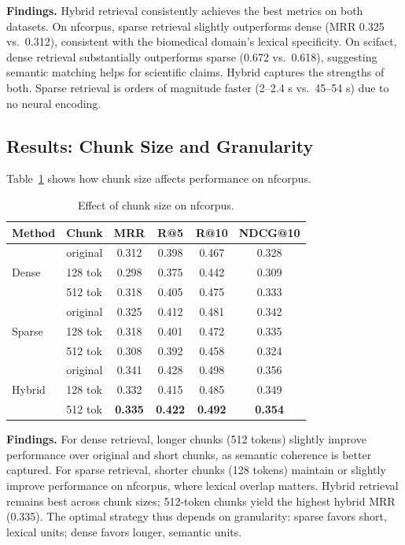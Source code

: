 \documentclass[twoside,11pt]{article}
\begin{document}
\textbf{Findings.} Hybrid retrieval consistently achieves the best metrics on both datasets. On nfcorpus, sparse retrieval slightly outperforms dense (MRR 0.325 vs.\ 0.312), consistent with the biomedical domain's lexical specificity. On scifact, dense retrieval substantially outperforms sparse (0.672 vs.\ 0.618), suggesting semantic matching helps for scientific claims. Hybrid captures the strengths of both. Sparse retrieval is orders of magnitude faster (2--2.4 s vs.\ 45--54 s) due to no neural encoding.

\subsection{Results: Chunk Size and Granularity}

Table~\ref{tab:chunk} shows how chunk size affects performance on nfcorpus.

\begin{table}[htbp]
\centering
\caption{Effect of chunk size on nfcorpus.}
\label{tab:chunk}
\begin{tabular}{llcccc}
\toprule
Method & Chunk & MRR & R@5 & R@10 & NDCG@10 \\
\midrule
\multirow{3}{*}{Dense}  & original & 0.312 & 0.398 & 0.467 & 0.328 \\
                        & 128 tok  & 0.298 & 0.375 & 0.442 & 0.309 \\
                        & 512 tok  & 0.318 & 0.405 & 0.475 & 0.333 \\
\midrule
\multirow{3}{*}{Sparse} & original & 0.325 & 0.412 & 0.481 & 0.342 \\
                        & 128 tok  & 0.318 & 0.401 & 0.472 & 0.335 \\
                        & 512 tok  & 0.308 & 0.392 & 0.458 & 0.324 \\
\midrule
\multirow{3}{*}{Hybrid} & original & 0.341 & 0.428 & 0.498 & 0.356 \\
                        & 128 tok  & 0.332 & 0.415 & 0.485 & 0.349 \\
                        & 512 tok  & \textbf{0.335} & \textbf{0.422} & \textbf{0.492} & \textbf{0.354} \\
\bottomrule
\end{tabular}
\end{table}

\textbf{Findings.} For dense retrieval, longer chunks (512 tokens) slightly improve performance over original and short chunks, as semantic coherence is better captured. For sparse retrieval, shorter chunks (128 tokens) maintain or slightly improve performance on nfcorpus, where lexical overlap matters. Hybrid retrieval remains best across chunk sizes; 512-token chunks yield the highest hybrid MRR (0.335). The optimal strategy thus depends on granularity: sparse favors short, lexical units; dense favors longer, semantic units.
\end{document}
